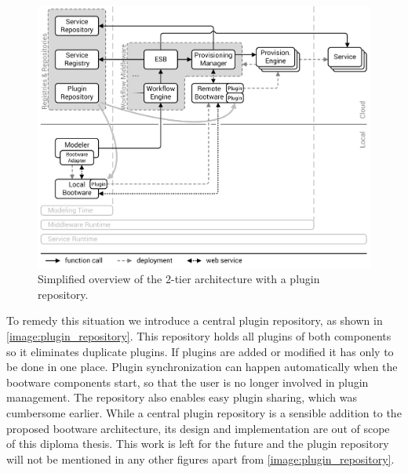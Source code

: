 \begin{figure}[!htbp]
	\centering
	\includegraphics[resolution=600]{design/assets/plugin_repository}
	\caption{Simplified overview of the 2-tier architecture with a plugin repository.}
	\label{image:plugin_repository}
\end{figure}

To remedy this situation we introduce a central plugin repository, as shown in \autoref{image:plugin_repository}.
This repository holds all plugins of both components so it eliminates duplicate plugins.
If plugins are added or modified it has only to be done in one place.
Plugin synchronization can happen automatically when the bootware components start, so that the user is no longer involved in plugin management.
The repository also enables easy plugin sharing, which was cumbersome earlier.
While a central plugin repository is a sensible addition to the proposed bootware architecture, its design and implementation are out of scope of this diploma thesis.
This work is left for the future and the plugin repository will not be mentioned in any other figures apart from \autoref{image:plugin_repository}.
